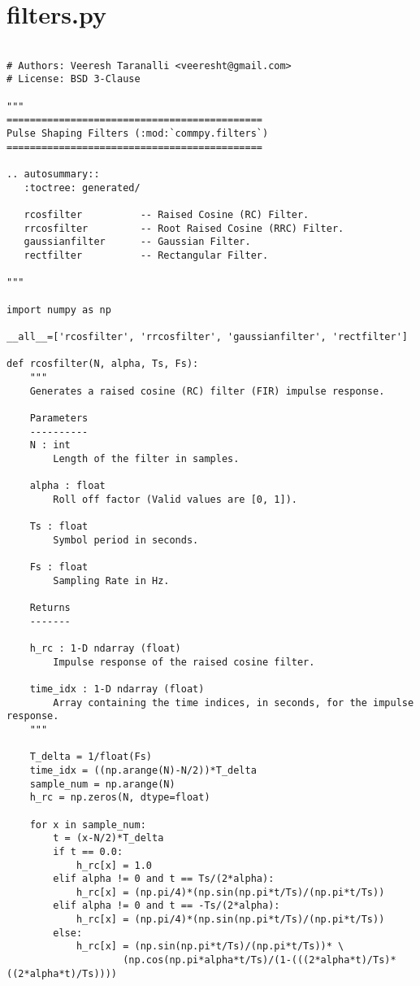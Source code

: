 \section{filters.py}
\begin{lstlisting}[breaklines]

# Authors: Veeresh Taranalli <veeresht@gmail.com>
# License: BSD 3-Clause

"""
============================================
Pulse Shaping Filters (:mod:`commpy.filters`)
============================================

.. autosummary::
   :toctree: generated/

   rcosfilter          -- Raised Cosine (RC) Filter.
   rrcosfilter         -- Root Raised Cosine (RRC) Filter.
   gaussianfilter      -- Gaussian Filter.
   rectfilter          -- Rectangular Filter.

"""

import numpy as np

__all__=['rcosfilter', 'rrcosfilter', 'gaussianfilter', 'rectfilter']

def rcosfilter(N, alpha, Ts, Fs):
    """
    Generates a raised cosine (RC) filter (FIR) impulse response.

    Parameters
    ----------
    N : int
        Length of the filter in samples.

    alpha : float
        Roll off factor (Valid values are [0, 1]).

    Ts : float
        Symbol period in seconds.

    Fs : float
        Sampling Rate in Hz.

    Returns
    -------

    h_rc : 1-D ndarray (float)
        Impulse response of the raised cosine filter.

    time_idx : 1-D ndarray (float)
        Array containing the time indices, in seconds, for the impulse response.
    """

    T_delta = 1/float(Fs)
    time_idx = ((np.arange(N)-N/2))*T_delta
    sample_num = np.arange(N)
    h_rc = np.zeros(N, dtype=float)

    for x in sample_num:
        t = (x-N/2)*T_delta
        if t == 0.0:
            h_rc[x] = 1.0
        elif alpha != 0 and t == Ts/(2*alpha):
            h_rc[x] = (np.pi/4)*(np.sin(np.pi*t/Ts)/(np.pi*t/Ts))
        elif alpha != 0 and t == -Ts/(2*alpha):
            h_rc[x] = (np.pi/4)*(np.sin(np.pi*t/Ts)/(np.pi*t/Ts))
        else:
            h_rc[x] = (np.sin(np.pi*t/Ts)/(np.pi*t/Ts))* \
                    (np.cos(np.pi*alpha*t/Ts)/(1-(((2*alpha*t)/Ts)*((2*alpha*t)/Ts))))


\end{lstlisting}
